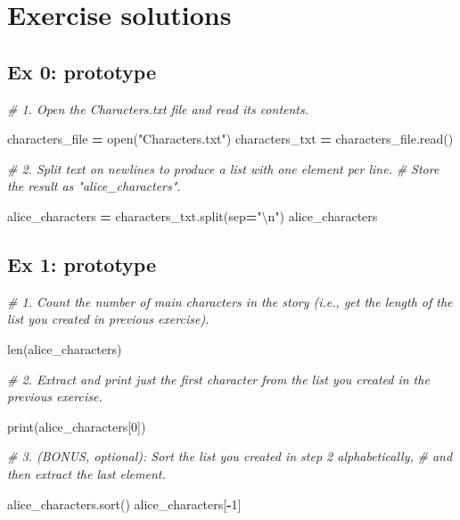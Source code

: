 \documentclass[]{book}
\newenvironment{Shaded}{\begin{snugshade}}{\end{snugshade}}
\newcommand{\BuiltInTok}[1]{#1}
\newcommand{\CharTok}[1]{\textcolor[rgb]{0.31,0.60,0.02}{#1}}
\newcommand{\CommentTok}[1]{\textcolor[rgb]{0.56,0.35,0.01}{\textit{#1}}}
\newcommand{\DecValTok}[1]{\textcolor[rgb]{0.00,0.00,0.81}{#1}}
\newcommand{\NormalTok}[1]{#1}
\newcommand{\OperatorTok}[1]{\textcolor[rgb]{0.81,0.36,0.00}{\textbf{#1}}}
\newcommand{\StringTok}[1]{\textcolor[rgb]{0.31,0.60,0.02}{#1}}
\begin{document}
\hypertarget{exercise-solutions-4}{%
\section{Exercise solutions}\label{exercise-solutions-4}}

\hypertarget{ex-0-prototype-4}{%
\subsection{Ex 0: prototype}\label{ex-0-prototype-4}}

\begin{Shaded}
\begin{Highlighting}[]
\CommentTok{# 1. Open the Characters.txt file and read its contents.}

\NormalTok{characters_file }\OperatorTok{=} \BuiltInTok{open}\NormalTok{(}\StringTok{"Characters.txt"}\NormalTok{)}
\NormalTok{characters_txt }\OperatorTok{=}\NormalTok{ characters_file.read()}

\CommentTok{# 2. Split text on newlines to produce a list with one element per line. }
\CommentTok{# Store the result as "alice_characters".}

\NormalTok{alice_characters }\OperatorTok{=}\NormalTok{ characters_txt.split(sep}\OperatorTok{=}\StringTok{"}\CharTok{\textbackslash{}n}\StringTok{"}\NormalTok{)}
\NormalTok{alice_characters}
\end{Highlighting}
\end{Shaded}

\hypertarget{ex-1-prototype-4}{%
\subsection{Ex 1: prototype}\label{ex-1-prototype-4}}

\begin{Shaded}
\begin{Highlighting}[]
\CommentTok{# 1. Count the number of main characters in the story (i.e., get the length of the list you created in previous exercise).}

\BuiltInTok{len}\NormalTok{(alice_characters)}

\CommentTok{# 2. Extract and print just the first character from the list you created in the previous exercise.}

\BuiltInTok{print}\NormalTok{(alice_characters[}\DecValTok{0}\NormalTok{])}

\CommentTok{# 3. (BONUS, optional): Sort the list you created in step 2 alphabetically, }
\CommentTok{# and then extract the last element.}

\NormalTok{alice_characters.sort()}
\NormalTok{alice_characters[}\OperatorTok{-}\DecValTok{1}\NormalTok{]}
\end{Highlighting}
\end{Shaded}
\end{document}
